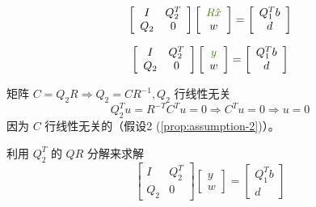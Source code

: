 \begin{equation}\displaystyle \left[\begin{array}{ c c }
    I & Q_{2}^{T}\\
    Q_{2} & 0
    \end{array}\right]\left[\begin{array}{ c }
    \textcolor[rgb]{0.25,0.46,0.02}{R\hat{x}}\\
    w
    \end{array}\right] =\left[\begin{array}{ c }
    Q_{1}^{T} b\\
    d
    \end{array}\right]\end{equation}

\begin{equation}\displaystyle \left[\begin{array}{ c c }
    I & Q_{2}^{T}\\
    Q_{2} & 0
    \end{array}\right]\left[\begin{array}{ c }
    \textcolor[rgb]{0.25,0.46,0.02}{y}\\
    w
    \end{array}\right] =\left[\begin{array}{ c }
    Q_{1}^{T} b\\
    d
    \end{array}\right]\end{equation}


矩阵 $ C=Q_{2} R \Rightarrow Q_{2}=C R^{-1}, Q_{2} $ 行线性无关
\begin{equation}
Q_{2}^{T} u=R^{-T} C^{T} u=0  \Rightarrow  C^{T} u=0 \Rightarrow  u=0
\end{equation}
因为 $ C $ 行线性无关的（假设2 (\ref{prop:assumption-2})）。

利用 $ Q_{2}^{T} $ 的 $ Q R $ 分解来求解
\begin{equation}
\left[\begin{array}{cc}
I & Q_{2}^{T} \\
Q_{2} & 0
\end{array}\right]\left[\begin{array}{l}
y \\
w
\end{array}\right]=\left[\begin{array}{c}
Q_{1}^{T} b \\
d
\end{array}\right]
\end{equation}

